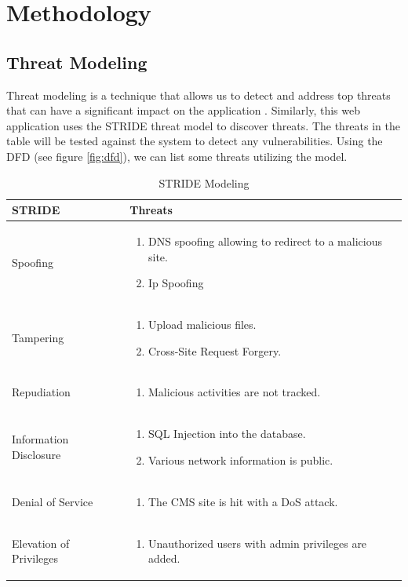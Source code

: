 \chapter{Methodology}
\section{Threat Modeling}
Threat modeling is a technique that allows us to detect and address top threats that can have a significant impact on the application \citep{threat_modeling}. Similarly, this web application uses the STRIDE threat model to discover threats. The threats in the table will be tested against the system to detect any vulnerabilities.
Using the DFD (see figure \ref{fig:dfd}), we can list some threats utilizing the model.

\begingroup
\centering
\setlength{\tabcolsep}{6.5pt} %
\renewcommand{\arraystretch}{1.8} %
\begin{longtable}{ |p{7cm}| p{8cm} |}
\caption{STRIDE Modeling}
    \label{table:spoofing}
\hline
\rowcolor{grey!15}
\textbf{STRIDE} & \textbf{Threats}\\
\hline
Spoofing & \begin{enumerate}
    \item DNS spoofing allowing to redirect to a malicious site.
    \item Ip Spoofing \citep[p.~2]{ip_spoofing}
\end{enumerate} \\
\hline
Tampering & \begin{enumerate}
    \item Upload malicious files.
    \item Cross-Site Request Forgery. \citep[p.~538]{crsf}
\end{enumerate} \\
\hline
Repudiation & \begin{enumerate}
    \item Malicious activities are not tracked.
\end{enumerate} \\
\hline
Information Disclosure & \begin{enumerate}
    \item SQL Injection into the database.
    \item Various network information is public.
\end{enumerate} \\
\hline
Denial of Service & \begin{enumerate}
    \item The CMS site is hit with a DoS attack.
\end{enumerate} \\
\hline
Elevation of Privileges & \begin{enumerate}
    \item Unauthorized users with admin privileges are added.
\end{enumerate} \\
\hline
\end{longtable}
\endgroup

